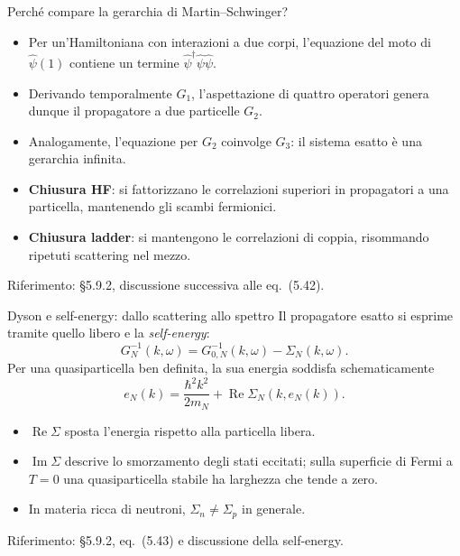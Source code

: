 \begin{frame}[t]{Perché compare la gerarchia di Martin--Schwinger?}
\small
\begin{itemize}
\item Per un'Hamiltoniana con interazioni a due corpi, l'equazione del moto di $\hat\psi(1)$ contiene un termine $\hat\psi^\dagger\hat\psi\hat\psi$.
\item Derivando temporalmente $G_1$, l'aspettazione di quattro operatori genera dunque il propagatore a due particelle $G_2$.
\item Analogamente, l'equazione per $G_2$ coinvolge $G_3$: il sistema esatto è una gerarchia infinita.
\item \textbf{Chiusura HF}: si fattorizzano le correlazioni superiori in propagatori a una particella, mantenendo gli scambi fermionici.
\item \textbf{Chiusura ladder}: si mantengono le correlazioni di coppia, risommando ripetuti scattering nel mezzo.
\end{itemize}
{\footnotesize Riferimento: §5.9.2, discussione successiva alle eq.~(5.42).}
\end{frame}

\begin{frame}[t]{Dyson e self-energy: dallo scattering allo spettro}
\small
Il propagatore esatto si esprime tramite quello libero e la \emph{self-energy}:
\[
G_N^{-1}(k,\omega)=G_{0,N}^{-1}(k,\omega)-\Sigma_N(k,\omega).
\]
Per una quasiparticella ben definita, la sua energia soddisfa schematicamente
\[
e_N(k)=\frac{\hbar^2k^2}{2m_N}
+\operatorname{Re}\Sigma_N(k,e_N(k)).
\]
\begin{itemize}
\item $\operatorname{Re}\Sigma$ sposta l'energia rispetto alla particella libera.
\item $\operatorname{Im}\Sigma$ descrive lo smorzamento degli stati eccitati; sulla superficie di Fermi a $T=0$ una quasiparticella stabile ha larghezza che tende a zero.
\item In materia ricca di neutroni, $\Sigma_n\neq\Sigma_p$ in generale.
\end{itemize}
{\footnotesize Riferimento: §5.9.2, eq.~(5.43) e discussione della self-energy.}
\end{frame}

